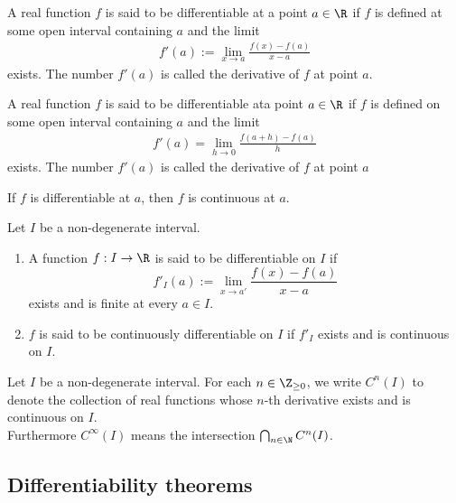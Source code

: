 \documentclass{article}
\begin{document}
\begin{definition}[Ross, 28.1]
    A real function $f$ is said to be differentiable at a
    point $a\in\R$ if $f$ is defined at some open interval containing
    $a$ and the limit
    \begin{align*}
        f'(a) := \lim_{x\to a}\frac{f(x)-f(a)}{x-a} 
    \end{align*}
    exists. The number $f'(a)$ is called the derivative of $f$
    at point $a$.
\end{definition}

\begin{definition}
    A real function $f$ is said to be differentiable ata point $a\in\R$
    if $f$ is defined on some open interval containing $a$ and the
    limit
    \begin{align*}
        f'(a)=\lim_{h\to 0}\frac{f(a+h)-f(a)}{h}
    \end{align*}
    exists. The number $f'(a)$ is called the derivative of $f$
    at point $a$
\end{definition}

\begin{theorem}[Ross, 28.2]
    If $f$ is differentiable at $a$, then $f$ is continuous at $a$. 
\end{theorem}

\begin{definition}
    Let $I$ be a non-degenerate interval.
    \begin{enumerate}[label=(\arabic*)]
        \item A function $f:I\to\R$ is said to be differentiable on $I$
        if \[f'_I(a):= \lim_{x\to a'}\frac{f(x)-f(a)}{x-a}\] exists and is
        finite at every $a\in I$.
        \item $f$ is said to be continuously differentiable on $I$ if $f'_I$
        exists and is continuous on $I$.
    \end{enumerate}
\end{definition}

\begin{definition*}
   Let $I$ be a non-degenerate interval. For each $n\in\Z_{\geq 0}$, we write
   $C^n(I)$ to denote the collection of real functions whose $n$-th derivative
   exists and is continuous on $I$.\\
   \indent
   Furthermore $C^\infty(I)$ means the intersection $\bigcap_{n\in\N}C^n(I)$. 
\end{definition*}

\subsection{Differentiability theorems}
\end{document}
